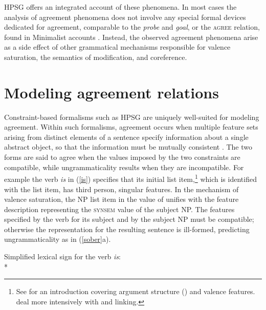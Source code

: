 \documentclass[output=paper
 	        ,biblatex
                ,babelshorthands
                ,newtxmath
                ,draftmode
                ,colorlinks, citecolor=brown
]{langscibook}
\begin{document}
HPSG offers an integrated account of these phenomena. In most cases the analysis of agreement phenomena does not involve any  special formal devices dedicated for agreement, comparable to the \textit{probe} and \textit{goal}, or the \textsc{agree} relation, found in Minimalist accounts \citep{Chomsky2000b-u}.  Instead, the observed agreement phenomena arise as a side effect of other grammatical mechanisms responsible for valence saturation, the semantics of modification, and coreference.  

\section{Modeling agreement relations} 
\label{unif-sec}\label{agreement:sec-unification}


Constraint-based formalisms such as HPSG are uniquely well-suited for modeling agreement.  
Within such formalisms, agreement occurs when 
multiple feature sets
 arising from distinct elements of a sentence specify information about a single abstract object, so that the information must be mutually consistent \citep{Kay:1984}.  
The two forms are said to agree when the values imposed by the two constraints are compatible, while ungrammaticality results when they are incompatible.  For example the  verb \textit{is} in (\ref{is}) specifies that its initial \argst list item,\footnote{
See  for an introduction covering argument structure (\argst) and valence features.  deal more intensively with \argst and linking.} which is identified with the \subj list item, has third person, singular features.  In the mechanism of valence saturation, the NP list item in the value of \subj unifies with the feature description representing the \textsc{synsem} value of the subject NP.  The features specified by the verb for its subject and by the subject NP must be compatible; otherwise the representation for the resulting sentence is ill-formed, predicting ungrammaticality as in (\ref{sober}a).  

\ea		
\label{is} 
Simplified lexical sign for the verb \textit{is}:\\*
\z
\end{document}
